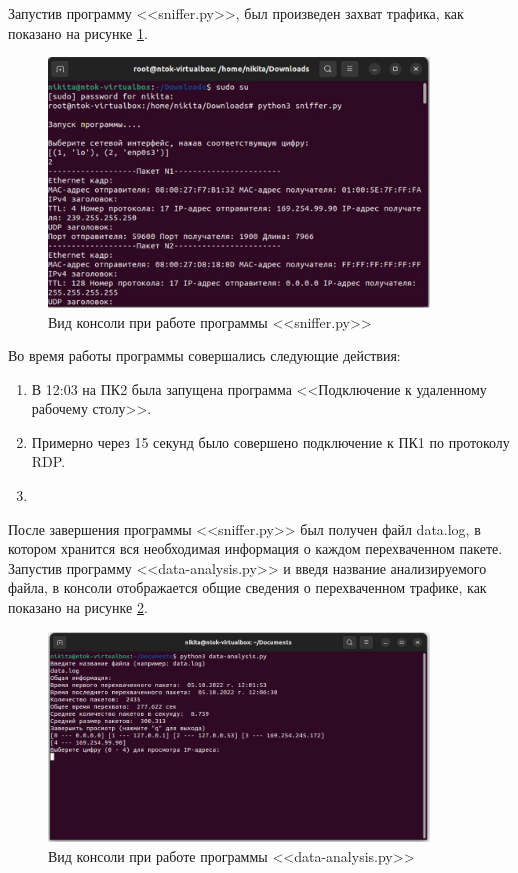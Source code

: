 \documentclass[bachelor, och, coursework]{SCWorks}
\begin{document}
  Запустив программу <<sniffer.py>>, был произведен захват трафика, как показано на рисунке \ref{cmd-strt}.
  
  \begin{figure}[H]
    \centering
    \includegraphics[width=0.9\textwidth]{photo/cmd-start.jpg}
    \caption{Вид консоли при работе программы <<sniffer.py>>}
    \label{cmd-strt}
  \end{figure}
  
  Во время работы программы совершались следующие действия:

  \begin{enumerate}
    \item В 12:03 на ПК2 была запущена программа <<Подключение к удаленному рабочему столу>>.
    \item Примерно через 15 секунд было совершено подключение к ПК1 по протоколу RDP.
    \item 
  \end{enumerate}
  
  После завершения программы <<sniffer.py>> был получен файл data.log, в котором хранится вся необходимая информация о каждом перехваченном пакете.
  Запустив программу <<data-analysis.py>> и введя название анализируемого файла, в консоли отображается общие сведения о перехваченном трафике, как показано
  на рисунке \ref{cmd-strt2}.
  
  \begin{figure}[H]
    \centering
    \includegraphics[width=0.9\textwidth]{photo/cmd-start2.jpg}
    \caption{Вид консоли при работе программы <<data-analysis.py>>}
    \label{cmd-strt2}
  \end{figure}
\end{document}
